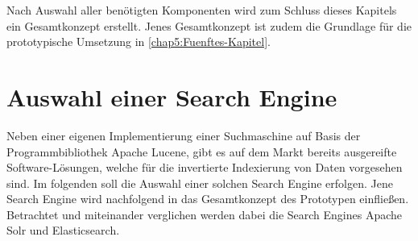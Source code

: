 Nach Auswahl aller benötigten Komponenten wird zum Schluss dieses Kapitels ein Gesamtkonzept erstellt. Jenes Gesamtkonzept ist zudem die Grundlage für die prototypische Umsetzung in \autoref{chap5:Fuenftes-Kapitel}.









\section{Auswahl einer Search Engine\label{sec4.2:Unterpunkt-2}}

Neben einer eigenen Implementierung einer Suchmaschine auf Basis der Programmbibliothek \glqq Apache Lucene\grqq{}, gibt es auf dem Markt bereits ausgereifte Software-Lösungen, welche für die invertierte Indexierung von Daten vorgesehen sind. Im folgenden soll die Auswahl einer solchen Search Engine erfolgen. Jene Search Engine wird nachfolgend in das Gesamtkonzept des Prototypen einfließen. Betrachtet und miteinander verglichen werden dabei die Search Engines \glqq Apache Solr\grqq{} und \glqq Elasticsearch\grqq{}.

